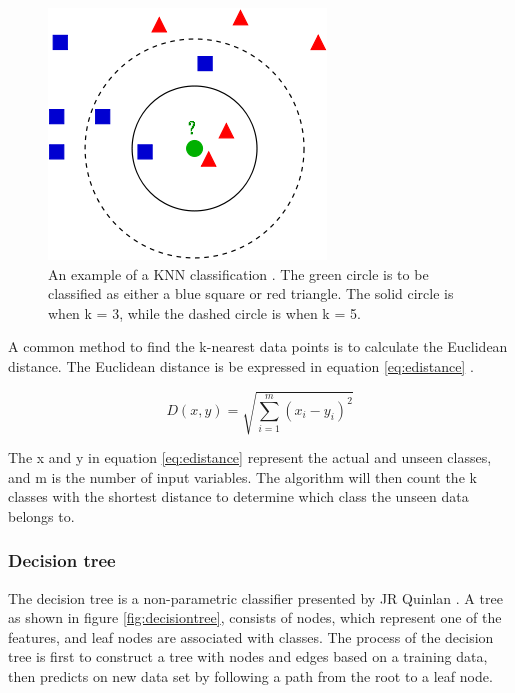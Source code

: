 \documentclass[USenglish]{ifimaster}  %
\begin{document}
\begin{figure}[h]
		\centering
		\includegraphics[scale=0.5]{Figures/KNN.png}
		\caption[An example of KNN classification]{An example of a KNN classification \cite{KnnClassification}. The green circle is to be classified as either a blue square or red triangle. The solid circle is when k = 3, while the dashed circle is when k = 5.}
		\label{fig:KNN}
\end{figure}


A common method to find the k-nearest data points is to calculate the Euclidean distance. The Euclidean distance is be expressed in equation \ref{eq:edistance}  \cite{Bao2004}.
	
\begin{equation}
	D(x,y)=\sqrt{\sum_{i=1}^{m}(x_{i}-y_{i})^2}
	\label{eq:edistance}
\end{equation}

The x and y in equation \ref{eq:edistance} represent the actual and unseen classes, and m is the number of input variables. The algorithm will then count the k classes with the shortest distance to determine which class the unseen data belongs to.
	
	
\subsubsection{Decision tree}
The decision tree is a non-parametric classifier presented by JR Quinlan \cite{Quinlan1986}. A tree as shown in figure \ref{fig:decisiontree}, consists of nodes, which represent one of the features, and leaf nodes are associated with classes. The process of the decision tree is first to construct a tree with nodes and edges based on a training data, then predicts on new data set by following a path from the root to a leaf node. 
\end{document}
